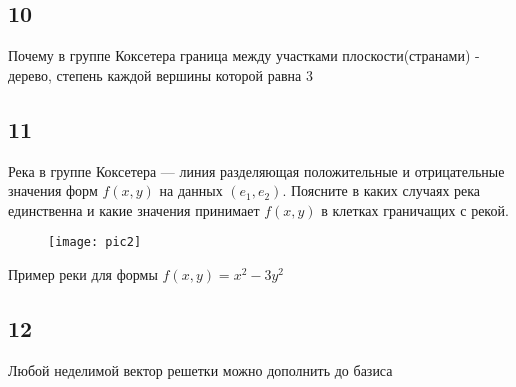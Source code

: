 	\subsection*{10}
	Почему в группе Коксетера граница между участками плоскости(странами) - дерево, степень каждой вершины которой равна $3$
	\newpage
	\subsection*{11}
	Река в группе Коксетера --- линия разделяющая положительные и отрицательные значения форм $f(x,y)$ на данных $(e_1, e_2)$. Поясните в каких случаях река единственна и какие значения принимает $f(x,y)$ в клетках граничащих с рекой.	
	\\
	\begin{figure}[h]
		\texttt{[image: pic2]}
	\end{figure}
	Пример реки для формы $f(x,y) = x^2 - 3y^2$

	\subsection*{12}
	Любой неделимой вектор решетки можно дополнить до базиса
		
	
\begin{comment}
	\newpage
	\section{2 модуль}
	
	\newpage
	\section{3 модуль}
	
	\newpage
	\section{4 модуль}
\end{comment}	
